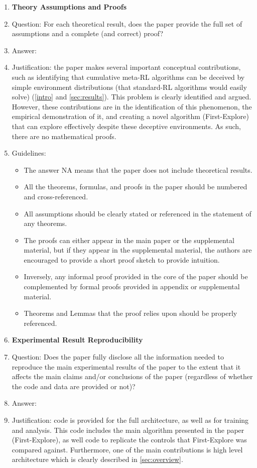 \documentclass{article}
\begin{document}
\begin{enumerate}
\item {\bf Theory Assumptions and Proofs}
    \item[] Question: For each theoretical result, does the paper provide the full set of assumptions and a complete (and correct) proof?
    \item[] Answer: \answerNA{} %
    \item[] Justification: the paper makes several important conceptual contributions, such as identifying that cumulative meta-RL algorithms can be deceived by simple environment distributions (that standard-RL algorithms would easily solve) (\cref{intro} and \cref{sec:results}). This problem is clearly identified and argued. However, these contributions are in the identification of this phenomenon, the empirical demonstration of it, and creating a novel algorithm (First-Explore) that can explore effectively despite these deceptive environments. As such, there are no mathematical proofs.
    \item[] Guidelines:
    \begin{itemize}
        \item The answer NA means that the paper does not include theoretical results. 
        \item All the theorems, formulas, and proofs in the paper should be numbered and cross-referenced.
        \item All assumptions should be clearly stated or referenced in the statement of any theorems.
        \item The proofs can either appear in the main paper or the supplemental material, but if they appear in the supplemental material, the authors are encouraged to provide a short proof sketch to provide intuition. 
        \item Inversely, any informal proof provided in the core of the paper should be complemented by formal proofs provided in appendix or supplemental material.
        \item Theorems and Lemmas that the proof relies upon should be properly referenced. 
    \end{itemize}

    \item {\bf Experimental Result Reproducibility}
    \item[] Question: Does the paper fully disclose all the information needed to reproduce the main experimental results of the paper to the extent that it affects the main claims and/or conclusions of the paper (regardless of whether the code and data are provided or not)?
    \item[] Answer: \answerYes{} %
    \item[] Justification: code is provided for the full architecture, as well as for training and analysis. This code includes the main algorithm presented in the paper (First-Explore), as well code to replicate the controls that First-Explore was compared against. Furthermore, one of the main contributions is high level architecture which is clearly described in \cref{sec:overview}.
    

\end{enumerate}
\end{document}
